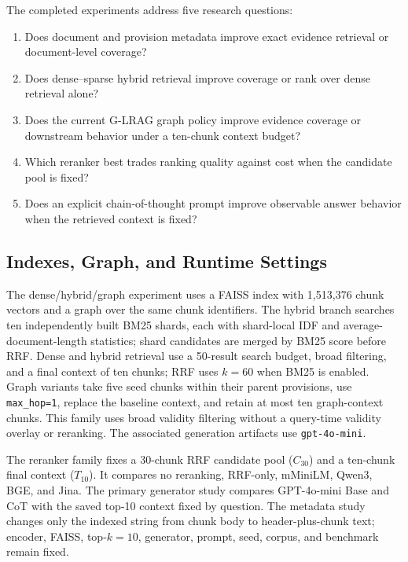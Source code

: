 The completed experiments address five research questions:
\begin{enumerate}
    \item Does document and provision metadata improve exact evidence
    retrieval or document-level coverage?
    \item Does dense--sparse hybrid retrieval improve coverage or rank over
    dense retrieval alone?
    \item Does the current G-LRAG graph policy improve evidence coverage or
    downstream behavior under a ten-chunk context budget?
    \item Which reranker best trades ranking quality against cost when the
    candidate pool is fixed?
    \item Does an explicit chain-of-thought prompt improve observable answer
    behavior when the retrieved context is fixed?
\end{enumerate}

\subsection{Indexes, Graph, and Runtime Settings}
\label{sec:build-process}

The dense/hybrid/graph experiment uses a FAISS index with 1,513,376 chunk
vectors and a graph over the same chunk identifiers. The hybrid branch
searches ten independently built BM25 shards, each with shard-local IDF and
average-document-length statistics; shard candidates are merged by BM25 score
before RRF. Dense and hybrid retrieval use a 50-result search budget, broad
filtering, and a final context of ten chunks; RRF uses $k=60$ when BM25 is
enabled. Graph variants take five seed chunks within their parent provisions,
use \texttt{max\_hop=1}, replace the baseline context, and retain at most ten
graph-context chunks. This family uses broad validity filtering without a
query-time validity overlay or reranking. The associated generation artifacts
use \texttt{gpt-4o-mini}.

The reranker family fixes a 30-chunk RRF candidate pool ($C_{30}$) and a
ten-chunk final context ($T_{10}$). It compares no reranking, RRF-only,
mMiniLM, Qwen3, BGE, and Jina. The primary generator study compares
GPT-4o-mini Base and CoT with the saved top-10 context fixed by question.
The metadata study changes only the indexed string from chunk body to
header-plus-chunk text; encoder, FAISS, top-$k=10$, generator, prompt, seed,
corpus, and benchmark remain fixed.

